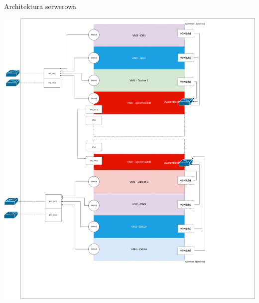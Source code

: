 \documentclass[presentation]{beamer}
\begin{document}
\begin{frame}[label={sec:orga292552}]{Architektura serwerowa}
\begin{center}
\includegraphics[width=.9\linewidth]{./data/siec/server_diagram.png}
\end{center}
\end{frame}
\end{document}
